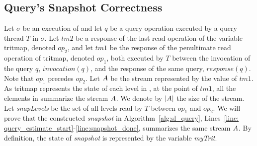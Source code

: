
\subsection{Query's Snapshot Correctness} \label{ssec:query_proof}
Let $\sigma$ be an execution of \mysketch and let $q$ be a query operation executed by a query thread $T$ in $\sigma$. 
Let $tm2$ be a response of the last read operation of the variable tritmap, denoted $op_2$, and let $tm1$ be the response of the penultimate read operation of tritmap, denoted $op_1$, both executed by $T$ between the invocation of the query $q$, $invocation(q)$, and the response of the same query, $response(q)$. Note that $op_1$ precedes $op_2$. 
Let $\mathnormal{A}$ be the stream represented by the value of $tm1$. As tritmap represents the state of each level in \mysketch, at the point of $tm1$, all the elements in \mysketch summarize the stream $\mathnormal{A}$. We denote by $|\mathnormal{A}|$ the size of the stream.
Let \emph{snapLevels} be the set of all levels read by $T$ between $op_1$ and $op_2$.
We will prove that the constructed \emph{snapshot} in Algorithm~\ref{alg:sl_query}, Lines~\ref{line: query_estimate_start}-\ref{line:snapshot_done}, summarizes the same stream $\mathnormal{A}$.
By definition, the state of \emph{snapshot} is represented by the variable \emph{myTrit}.


